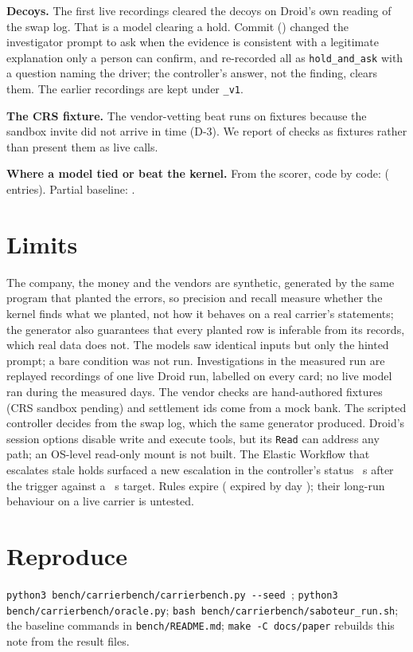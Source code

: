 \documentclass[conference]{IEEEtran}
\newcommand{\code}[1]{\texttt{#1}}
\begin{document}
\textbf{Decoys.} The first live recordings cleared the \nDecoys{} decoys on Droid's own reading of the swap log. That is a model clearing a hold. Commit \commitDecoyRerecord{} (\commitDecoyRerecordDate) changed the investigator prompt to ask when the evidence is consistent with a legitimate explanation only a person can confirm, and re-recorded all \nDecoys{} as \code{hold\_and\_ask} with a question naming the driver; the controller's answer, not the finding, clears them. The earlier recordings are kept under \code{\_v1}.

\textbf{The CRS fixture.} The vendor-vetting beat runs on fixtures because the sandbox invite did not arrive in time (D-3). We report \vcFixture{} of \vcHolds{} checks as fixtures rather than present them as live calls.

\textbf{Where a model tied or beat the kernel.} From the scorer, code by code: \tiesOrWinsText{} (\tiesOrWinsCount{} entries). Partial baseline: \basePartial.

\section{Limits}

The company, the money and the vendors are synthetic, generated by the same program that planted the errors, so precision and recall measure whether the kernel finds what we planted, not how it behaves on a real carrier's statements; the generator also guarantees that every planted row is inferable from its records, which real data does not. The models saw identical inputs but only the hinted prompt; a bare condition was not run. Investigations in the measured run are replayed recordings of one live Droid run, labelled on every card; no live model ran during the measured \nDays{} days. The vendor checks are hand-authored fixtures (CRS sandbox pending) and settlement ids come from a mock bank. The scripted controller decides from the swap log, which the same generator produced. Droid's session options disable write and execute tools, but its \code{Read} can address any path; an OS-level read-only mount is not built. The Elastic Workflow that escalates stale holds surfaced a new escalation in the controller's status \escalationSec~s after the trigger against a \escalationTargetSec~s target. Rules expire ( expired by day \nDays); their long-run behaviour on a live carrier is untested.

\section*{Reproduce}

\code{python3 bench/carrierbench/carrierbench.py -{}-seed \benchSeed}; \code{python3 bench/carrierbench/oracle.py}; \code{bash bench/carrierbench/saboteur\_run.sh}; the baseline commands in \code{bench/README.md}; \code{make -C docs/paper} rebuilds this note from the result files.
\end{document}
